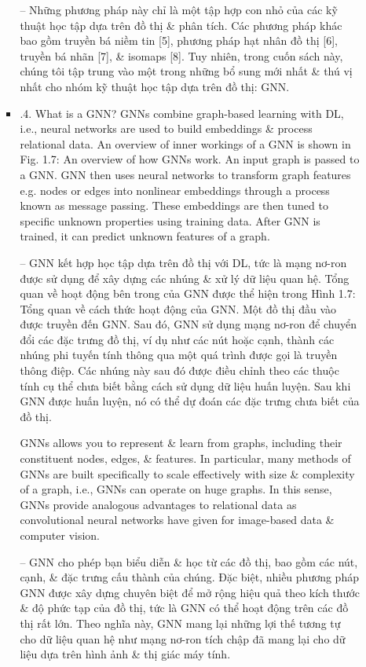 \documentclass{article}
\begin{document}
\begin{itemize}
\begin{itemize}
\begin{itemize}
            -- Những phương pháp này chỉ là một tập hợp con nhỏ của các kỹ thuật học tập dựa trên đồ thị \& phân tích. Các phương pháp khác bao gồm truyền bá niềm tin [5], phương pháp hạt nhân đồ thị [6], truyền bá nhãn [7], \& isomaps [8]. Tuy nhiên, trong cuốn sách này, chúng tôi tập trung vào một trong những bổ sung mới nhất \& thú vị nhất cho nhóm kỹ thuật học tập dựa trên đồ thị: GNN.
            \item {.4. What is a GNN?} GNNs combine graph-based learning with DL, i.e., neural networks are used to build embeddings \& process relational data. An overview of inner workings of a GNN is shown in {\sf Fig. 1.7: An overview of how GNNs work. An input graph is passed to a GNN. GNN then uses neural networks to transform graph features e.g. nodes or edges into nonlinear embeddings through a process known as message passing. These embeddings are then tuned to specific unknown properties using training data. After GNN is trained, it can predict unknown features of a graph.}

            -- GNN kết hợp học tập dựa trên đồ thị với DL, tức là mạng nơ-ron được sử dụng để xây dựng các nhúng \& xử lý dữ liệu quan hệ. Tổng quan về hoạt động bên trong của GNN được thể hiện trong {\sf Hình 1.7: Tổng quan về cách thức hoạt động của GNN. Một đồ thị đầu vào được truyền đến GNN. Sau đó, GNN sử dụng mạng nơ-ron để chuyển đổi các đặc trưng đồ thị, ví dụ như các nút hoặc cạnh, thành các nhúng phi tuyến tính thông qua một quá trình được gọi là truyền thông điệp. Các nhúng này sau đó được điều chỉnh theo các thuộc tính cụ thể chưa biết bằng cách sử dụng dữ liệu huấn luyện. Sau khi GNN được huấn luyện, nó có thể dự đoán các đặc trưng chưa biết của đồ thị.}

            GNNs allows you to represent \& learn from graphs, including their constituent nodes, edges, \& features. In particular, many methods of GNNs are built specifically to scale effectively with size \& complexity of a graph, i.e., GNNs can operate on huge graphs. In this sense, GNNs provide analogous advantages to relational data as convolutional neural networks have given for image-based data \& computer vision.

            -- GNN cho phép bạn biểu diễn \& học từ các đồ thị, bao gồm các nút, cạnh, \& đặc trưng cấu thành của chúng. Đặc biệt, nhiều phương pháp GNN được xây dựng chuyên biệt để mở rộng hiệu quả theo kích thước \& độ phức tạp của đồ thị, tức là GNN có thể hoạt động trên các đồ thị rất lớn. Theo nghĩa này, GNN mang lại những lợi thế tương tự cho dữ liệu quan hệ như mạng nơ-ron tích chập đã mang lại cho dữ liệu dựa trên hình ảnh \& thị giác máy tính.


\end{itemize}
\end{itemize}
\end{itemize}
\end{document}
